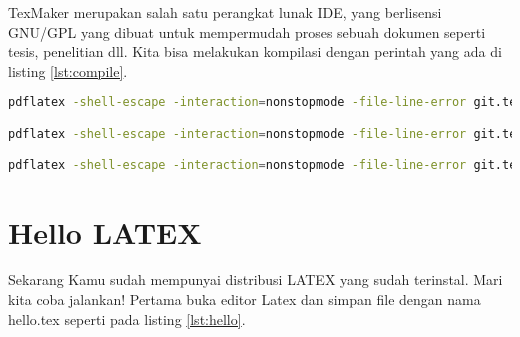 TexMaker merupakan salah satu perangkat lunak IDE, yang berlisensi GNU/GPL yang dibuat untuk mempermudah proses sebuah dokumen seperti tesis, penelitian dll. Kita bisa melakukan kompilasi dengan perintah yang ada di listing \ref{lst:compile}.

\begin{lstlisting}[caption=Perintah kompilasi latex keluaran pdf,label={lst:compile},language=sh]
pdflatex -shell-escape -interaction=nonstopmode -file-line-error git.tex | grep ".*:[0-9]*:.*|LaTeX Warning:"

pdflatex -shell-escape -interaction=nonstopmode -file-line-error git.tex | grep ".*:[0-9]*:.*"

pdflatex -shell-escape -interaction=nonstopmode -file-line-error git.tex | grep -i ".*:[0-9]*:.*\|warning"
\end{lstlisting} 

\section{Hello LATEX}
Sekarang Kamu sudah mempunyai distribusi LATEX yang sudah terinstal. Mari kita coba jalankan! Pertama buka editor Latex dan simpan file dengan nama hello.tex seperti pada listing \ref{lst:hello}.
\cite{kline2018latex}
